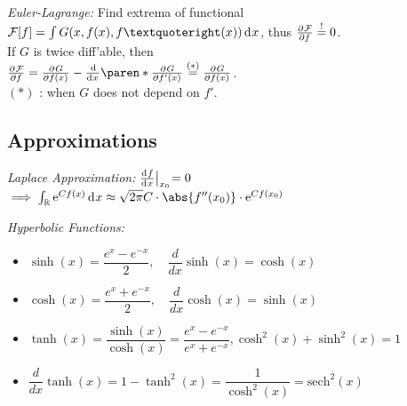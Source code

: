 \emph{Euler-Lagrange:}
Find extrema of functional $\mathcal F[f] = \int G(x, f(x), f’(x)) \diff x$,
thus $\pderiv{\mathcal F}{f} \overset!= 0$.
\\
If $G$ is twice diff'able, then
\\
$\pderiv{\mathcal F}{f} = \pderiv{G}{f(x)} - \deriv{}{x} \paren*{ \pderiv{G}{f'(x)} } \overset{(\ast)}= \pderiv{G}{f(x)}$.
\\
$(\ast)$ : when $G$ does not depend on $f'$.



\subsection{Approximations}

\emph{Laplace Approximation:}
$\deriv{f}{x} \big\vert_{x_0} \!= 0$\\
$\implies \int_{\mathbb R} \eu^{C f(x)} \diff x \approx \sqrt{2\pi} C \cdot \abs{f''(x_0)} \cdot \eu^{C f(x_0)}$

\emph{Hyperbolic Functions:}\\
\begin{itemize}
    \item $\sinh(x)=\dfrac{e^x - e^{-x}}{2},\quad \dfrac{d}{dx} \sinh(x)= \cosh(x)$ \\
    \item $\cosh(x) = \dfrac{e^x + e^{-x}}{2}, \quad \dfrac{d}{dx} \cosh(x)= \sinh(x)$\\
    \item $ \tanh(x) = \dfrac{\sinh(x)}{\cosh(x)}=\dfrac{e^x - e^{-x}}{e^x + e^{-x}}, \cosh^2(x) + \sinh^2(x) = 1 $\\
    \item $\dfrac{d}{dx} \tanh(x)= 1-\tanh^2(x)=\dfrac{1}{\cosh^2(x)}=\text{sech}^2(x)$
\end{itemize}
